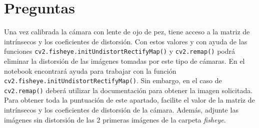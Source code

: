 \newpage
\section*{Preguntas}

\vspace{5mm}
\begin{tcolorbox}[colback=gray!10, colframe=gray!30, coltitle=black, title=Pregunta B.1, halign=left]
Una vez calibrada la cámara con lente de ojo de pez, tiene acceso a la matriz de intrínsecos y los coeficientes de distorsión. Con estos valores y con ayuda de las funciones \texttt{cv2.fisheye.initUndistortRectifyMap()} y \texttt{cv2.remap()} podrá eliminar la distorsión de las imágenes tomadas por este tipo de cámaras. En el notebook encontrará ayuda para trabajar con la función \texttt{cv2.fisheye.initUndistortRectifyMap()}. Sin embargo, en el caso de \texttt{cv2.remap()} \footnotemark deberá utilizar la documentación para obtener la imagen solicitada. Para obtener toda la puntuación de este apartado, facilite el valor de la matriz de intrínsecos y los coeficientes de distorsión de la cámara. Además, adjunte las imágenes sin distorsión de las 2 primeras imágenes de la carpeta \textit{fisheye}.
\end{tcolorbox}



